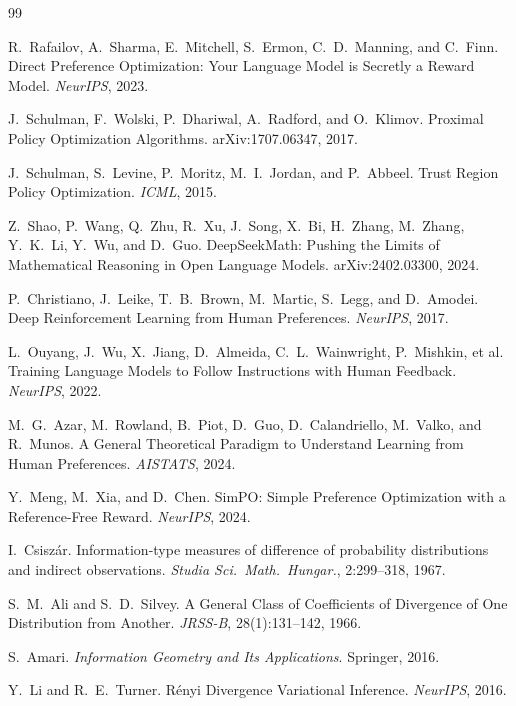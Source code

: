 \documentclass[11pt]{article}
\theoremstyle{definition}
\theoremstyle{remark}
\begin{document}
\begin{thebibliography}{99}\setlength{\itemsep}{0pt}

R.~Rafailov, A.~Sharma, E.~Mitchell, S.~Ermon, C.~D.~Manning, and C.~Finn.
Direct Preference Optimization: Your Language Model is Secretly a Reward Model.
\emph{NeurIPS}, 2023.

J.~Schulman, F.~Wolski, P.~Dhariwal, A.~Radford, and O.~Klimov.
Proximal Policy Optimization Algorithms.
arXiv:1707.06347, 2017.

J.~Schulman, S.~Levine, P.~Moritz, M.~I.~Jordan, and P.~Abbeel.
Trust Region Policy Optimization.
\emph{ICML}, 2015.

Z.~Shao, P.~Wang, Q.~Zhu, R.~Xu, J.~Song, X.~Bi, H.~Zhang, M.~Zhang, Y.~K.~Li, Y.~Wu, and D.~Guo.
DeepSeekMath: Pushing the Limits of Mathematical Reasoning in Open Language Models.
arXiv:2402.03300, 2024.

P.~Christiano, J.~Leike, T.~B.~Brown, M.~Martic, S.~Legg, and D.~Amodei.
Deep Reinforcement Learning from Human Preferences.
\emph{NeurIPS}, 2017.

L.~Ouyang, J.~Wu, X.~Jiang, D.~Almeida, C.~L.~Wainwright, P.~Mishkin, et al.
Training Language Models to Follow Instructions with Human Feedback.
\emph{NeurIPS}, 2022.

M.~G.~Azar, M.~Rowland, B.~Piot, D.~Guo, D.~Calandriello, M.~Valko, and R.~Munos.
A General Theoretical Paradigm to Understand Learning from Human Preferences.
\emph{AISTATS}, 2024.

Y.~Meng, M.~Xia, and D.~Chen.
SimPO: Simple Preference Optimization with a Reference-Free Reward.
\emph{NeurIPS}, 2024.

I.~Csisz\'ar.
Information-type measures of difference of probability distributions and indirect observations.
\emph{Studia Sci.\ Math.\ Hungar.}, 2:299--318, 1967.

S.~M.~Ali and S.~D.~Silvey.
A General Class of Coefficients of Divergence of One Distribution from Another.
\emph{JRSS-B}, 28(1):131--142, 1966.

S.~Amari.
\emph{Information Geometry and Its Applications}.
Springer, 2016.

Y.~Li and R.~E.~Turner.
R\'enyi Divergence Variational Inference.
\emph{NeurIPS}, 2016.


\end{thebibliography}
\end{document}
